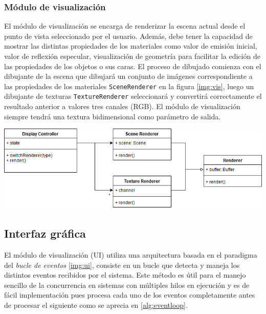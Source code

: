 \subsubsection{Módulo de visualización}

El módulo de visualización se encarga de renderizar la escena actual desde el punto de vista seleccionado por el usuario. Además, debe tener la capacidad de mostrar las distintas propiedades de los materiales como valor de emisión inicial, valor de reflexión especular, visualización de geometría para facilitar la edición de las propiedades de los objetos o sus caras. El proceso de dibujado comienza con el dibujante de la escena que dibujará un conjunto de imágenes correspondiente a las propiedades de los materiales \verb|SceneRenderer| en la figura \ref{img:vis}, luego un dibujante de texturas \verb|TextureRenderer| seleccionará y convertirá correctamente el resultado anterior a valores tres canales (RGB). El módulo de visualización siempre tendrá una textura bidimensional como parámetro de salida.

\vspace{5mm}
\begin{minipage}[h]{0.8\linewidth}
	\centering
	\includegraphics[width=\linewidth]{assets/display}
	\label{img:vis}
\end{minipage}

\subsection{Interfaz gráfica}

El módulo de visualización (UI) utiliza una arquitectura basada en el paradigma del \textit{bucle de eventos} \ref{img:ui}, consiste en un bucle que detecta y maneja los distintos eventos recibidos por el sistema. Este método es útil para el manejo sencillo de la concurrencia en sistemas con múltiples hilos en ejecución y es de fácil implementación pues procesa cada uno de los eventos completamente antes de procesar el siguiente como se aprecia en \ref{alg:eventloop}.

